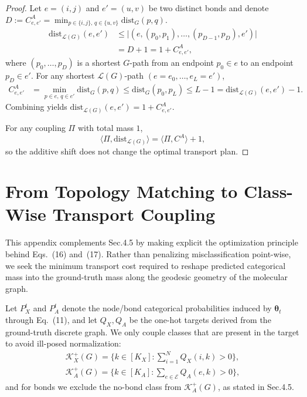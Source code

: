 \documentclass[numsec,webpdf,contemporary,large]{oup-authoring-template}%
\theoremstyle{thmstyleone}%
\theoremstyle{thmstyletwo}%
\theoremstyle{thmstylethree}%
\begin{document}
\begin{proof}
Let $e=(i,j)$ and $e'=(u,v)$ be two distinct bonds and denote
$D:=C^{A}_{e,e'}=\min_{p\in\{i,j\},\,q\in\{u,v\}}\mathrm{dist}_G(p,q)$.
\begin{align}
\mathrm{dist}_{\mathcal{L}(G)}(e,e')
&\le
\big|(e,(p_0,p_1),\ldots,(p_{D-1},p_D),e')\big|
\\
&=
D+1
=
1+C^{A}_{e,e'},
\end{align}
where $(p_0,\ldots,p_D)$ is a shortest $G$-path from an endpoint $p_0\in e$ to an endpoint $p_D\in e'$.
For any shortest $\mathcal{L}(G)$-path $(e=e_0,\ldots,e_L=e')$,
\begin{align}
C^{A}_{e,e'}
&=
\min_{p\in e,\,q\in e'}\mathrm{dist}_G(p,q)
\le
\mathrm{dist}_G(p_0,p_L)
\le
L-1
=
\mathrm{dist}_{\mathcal{L}(G)}(e,e')-1 .
\end{align}
Combining yields $\mathrm{dist}_{\mathcal{L}(G)}(e,e')=1+C^{A}_{e,e'}$.

For any coupling $\Pi$ with total mass $1$,
\begin{equation}
\langle \Pi,\mathrm{dist}_{\mathcal{L}(G)}\rangle
=
\langle \Pi,C^{A}\rangle + 1,
\end{equation}
so the additive shift does not change the optimal transport plan.
\end{proof}


\section{From Topology Matching to Class-Wise Transport Coupling}
\label{app:qw:derivation}

This appendix complements Sec.4.5 by making explicit the optimization principle behind Eqs.~(16) and~(17). Rather than penalizing misclassification point-wise, we seek the minimum transport cost required to reshape predicted categorical mass into the ground-truth mass along the geodesic geometry of the molecular graph.

Let $P_X^{t}$ and $P_A^{t}$ denote the node/bond
categorical probabilities induced by $\boldsymbol{\theta}_t$ through Eq.~(11),
and let $Q_X,Q_A$ be the one-hot targets derived from the ground-truth discrete graph.
We only couple classes that are present in the target to avoid ill-posed normalization:
\begin{align}
\mathcal{K}_X^{+}(G)=\Big\{k\in[K_X]:\sum_{i=1}^{N} Q_X(i,k) > 0\Big\}, \\
\mathcal{K}_A^{+}(G)=\Big\{k\in[K_A]:\sum_{e\in\mathcal{E}} Q_A(e,k) > 0\Big\},
\end{align}
and for bonds we exclude the no-bond class from $\mathcal{K}_A^{+}(G)$, as stated in Sec.4.5.
\end{document}

